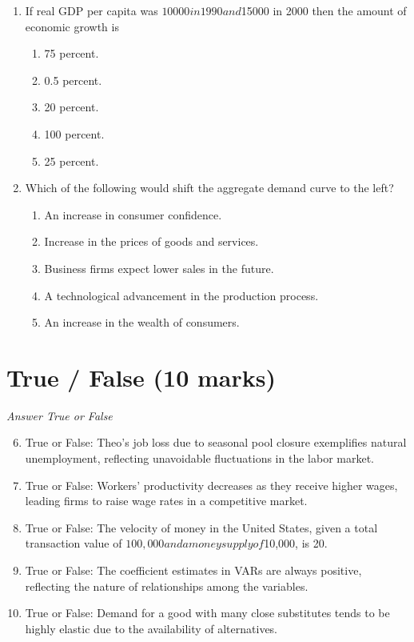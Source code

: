 \documentclass[12pt]{article}
\begin{document}
\begin{enumerate}[label=\arabic*.]
\item If real GDP per capita was $10000 in 1990 and $15000 in 2000 then the amount of economic growth is
\begin{enumerate}[label=(\alph*)]
    \item 75 percent.
    \item 0.5 percent.
    \item 20 percent.
    \item 100 percent.
    \item 25 percent.
\end{enumerate}
\item Which of the following would shift the aggregate demand curve to the left?
\begin{enumerate}[label=(\alph*)]
    \item An increase in consumer confidence.
    \item Increase in the prices of goods and services.
    \item Business firms expect lower sales in the future.
    \item A technological advancement in the production process.
    \item An increase in the wealth of consumers.
\end{enumerate}
\end{enumerate}

\section*{True / False (10 marks)}
\textit{Answer True or False}
\begin{enumerate}[label=\arabic*.]
\setcounter{enumi}{5}
\item True or False: Theo's job loss due to seasonal pool closure exemplifies natural unemployment, reflecting unavoidable fluctuations in the labor market.
\item True or False: Workers' productivity decreases as they receive higher wages, leading firms to raise wage rates in a competitive market.
\item True or False: The velocity of money in the United States, given a total transaction value of $100,000 and a money supply of $10,000, is 20.
\item True or False: The coefficient estimates in VARs are always positive, reflecting the nature of relationships among the variables.
\item True or False: Demand for a good with many close substitutes tends to be highly elastic due to the availability of alternatives.
\end{enumerate}
\end{document}
